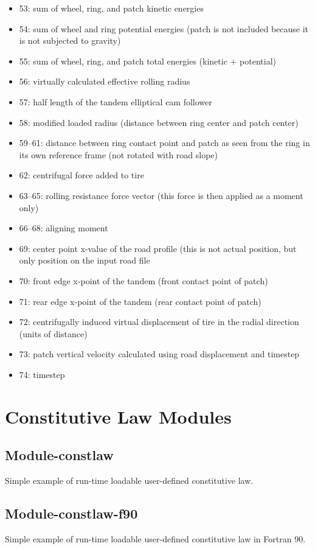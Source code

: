 \begin{itemize}
\item 53: sum of wheel, ring, and patch kinetic energies
\item 54: sum of wheel and ring potential energies (patch is not included because it is not subjected to gravity)
\item 55: sum of wheel, ring, and patch total energies (kinetic + potential)
\item 56: virtually calculated effective rolling radius
\item 57: half length of the tandem elliptical cam follower
\item 58: modified loaded radius (distance between ring center and patch center)
\item 59--61: distance between ring contact point and patch as seen from the ring in its own reference frame (not rotated with road slope)
\item 62: centrifugal force added to tire
\item 63--65: rolling resistance force vector (this force is then applied as a moment only)
\item 66--68: aligning moment
\item 69: center point x-value of the road profile (this is not actual position, but only position on the input road file
\item 70: front edge x-point of the tandem (front contact point of patch)
\item 71: rear edge x-point of the tandem (rear contact point of patch)
\item 72: centrifugally induced virtual displacement of tire in the radial direction (units of distance)
\item 73: patch vertical velocity calculated using road displacement and timestep
\item 74: timestep
\end{itemize}



\section{Constitutive Law Modules}

\subsection{Module-constlaw}
Simple example of run-time loadable user-defined constitutive law.

\subsection{Module-constlaw-f90}
Simple example of run-time loadable user-defined constitutive law in Fortran 90.


